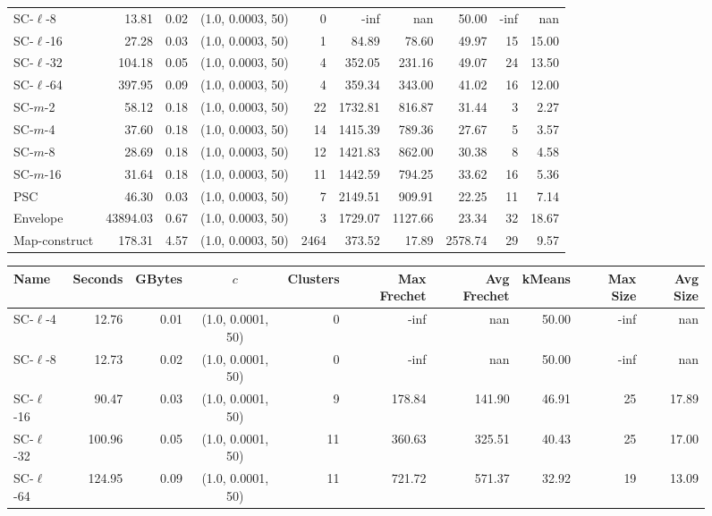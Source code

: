 \documentclass[11pt]{article}
\begin{document}
\begin{figure}
\begin{center}
\begin{minipage}{\textwidth}
{\begin{tabular}{@{}lrrcrrrrrr@{}}
        SC-$\ell$-8 & 13.81 & 0.02 & (1.0, 0.0003, 50) & 0 & -inf & nan & 50.00 & -inf & nan\\
        SC-$\ell$-16 & 27.28 & 0.03 & (1.0, 0.0003, 50) & 1 & 84.89 & 78.60 & 49.97 & 15 & 15.00\\
        SC-$\ell$-32 & 104.18 & 0.05 & (1.0, 0.0003, 50) & 4 & 352.05 & 231.16 & 49.07 & 24 & 13.50\\
        SC-$\ell$-64 & 397.95 & 0.09 & (1.0, 0.0003, 50) & 4 & 359.34 & 343.00 & 41.02 & 16 & 12.00\\
        SC-$m$-2 & 58.12 & 0.18 & (1.0, 0.0003, 50) & 22 & 1732.81 & 816.87 & 31.44 & 3 & 2.27\\
        SC-$m$-4 & 37.60 & 0.18 & (1.0, 0.0003, 50) & 14 & 1415.39 & 789.36 & 27.67 & 5 & 3.57\\
        SC-$m$-8 & 28.69 & 0.18 & (1.0, 0.0003, 50) & 12 & 1421.83 & 862.00 & 30.38 & 8 & 4.58\\
        SC-$m$-16 & 31.64 & 0.18 & (1.0, 0.0003, 50) & 11 & 1442.59 & 794.25 & 33.62 & 16 & 5.36\\
        PSC & 46.30 & 0.03 & (1.0, 0.0003, 50) & 7 & 2149.51 & 909.91 & 22.25 & 11 & 7.14\\
        Envelope & 43894.03 & 0.67 & (1.0, 0.0003, 50) & 3 & 1729.07 & 1127.66 & 23.34 & 32 & 18.67\\
        Map-construct & 178.31 & 4.57 & (1.0, 0.0003, 50) & 2464 & 373.52 & 17.89 & 2578.74 & 29 & 9.57\\
        \bottomrule
    \end{tabular}
    }
    {
    \begin{tabular}{@{}lrrcrrrrrr@{}}
        \toprule
        Name & Seconds & GBytes & $c$ & Clusters & Max Frechet & Avg Frechet & kMeans & Max Size & Avg Size\\
        \midrule
        SC-$\ell$-4 & 12.76 & 0.01 & (1.0, 0.0001, 50) & 0 & -inf & nan & 50.00 & -inf & nan\\
        SC-$\ell$-8 & 12.73 & 0.02 & (1.0, 0.0001, 50) & 0 & -inf & nan & 50.00 & -inf & nan\\
        SC-$\ell$-16 & 90.47 & 0.03 & (1.0, 0.0001, 50) & 9 & 178.84 & 141.90 & 46.91 & 25 & 17.89\\
        SC-$\ell$-32 & 100.96 & 0.05 & (1.0, 0.0001, 50) & 11 & 360.63 & 325.51 & 40.43 & 25 & 17.00\\
        SC-$\ell$-64 & 124.95 & 0.09 & (1.0, 0.0001, 50) & 11 & 721.72 & 571.37 & 32.92 & 19 & 13.09\\

\end{tabular}}
\end{minipage}
\end{center}
\end{figure}
\end{document}
